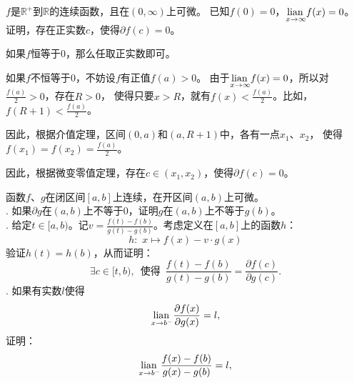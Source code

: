 \documentclass[12pt,UTF8]{ctexbook}
\begin{document}
\begin{ex}\label{ex:3-2-4-20}
    $f$是$\mathbb{R}^+$到$\mathbb{R}$的连续函数，且在$(0,\infty)$上可微。
    已知$f(0) = 0$，$\underset{x\to\infty}{\operatorname{lian}\,} f(x) = 0$。
    证明，存在正实数$c$，使得$\partial f(c) = 0$。
\end{ex}

\begin{so}
    如果$f$恒等于$0$，那么任取正实数即可。

    如果$f$不恒等于$0$，不妨设$f$有正值$f(a) > 0$。
    由于$\underset{x\to\infty}{\operatorname{lian}\,} f(x) = 0$，所以对$\frac{f(a)}{2} > 0$，存在$R > 0$，
    使得只要$x > R$，就有$f(x) < \frac{f(a)}{2}$。比如，$f(R+1) < \frac{f(a)}{2}$。

    因此，根据介值定理，区间$(0, a)$和$(a, R+1)$中，各有一点$x_1$、$x_2$，
    使得$f(x_1) = f(x_2) = \frac{f(a)}{2}$。

    因此，根据微变零值定理，存在$c\in(x_1, x_2)$，使得$\partial f(c) = 0$。

\end{so}

\begin{ex}\label{ex:3-2-4-30}  %
    函数$f$、$g$在闭区间$[a, b]$上连续，在开区间$(a, b)$上可微。\\
    . 如果$\partial g$在$(a, b)$上不等于$0$，证明$g$在$(a, b)$上不等于$g(b)$。\\
    . 给定$t\in[a, b)$。记$v = \frac{f(t) - f(b)}{g(t) - g(b)}$。考虑定义在$[a,b]$上的函数$h$：
    $$ h: \,\, x \mapsto f(x) - v\cdot g(x)$$
    验证$h(t) = h(b)$，从而证明：
    $$ \exists c \in [t, b), \,\,\, \mbox{使得} \,\,\, \frac{f(t) - f(b)}{g(t) - g(b)} = \frac{\partial f(c)}{\partial g(c)}. $$
    . 如果有实数$l$使得
    $$ \underset{x\to b^-}{\operatorname{lian}\,} \frac{\partial f(x)}{\partial g(x)} = l, $$
    证明：
    $$ \underset{x\to b^-}{\operatorname{lian}\,}  \frac{f(x) - f(b)}{g(x) - g(b)} = l, $$
\end{ex}
\end{document}
